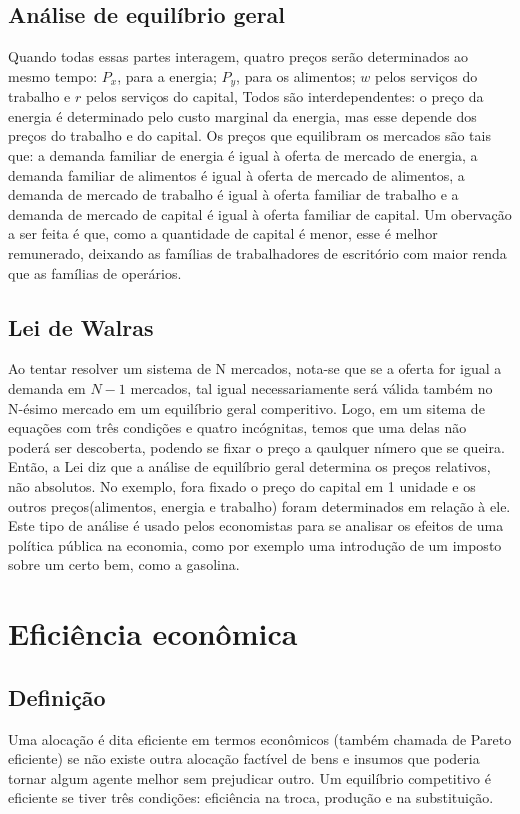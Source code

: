 \documentclass[oneside,12pt, letterpaper]{book}
\begin{document}
{{{\section{An{\'a}lise de equil{\'i}brio geral}
Quando todas essas partes interagem, quatro pre{\c c}os ser{\~a}o determinados ao mesmo tempo: $P_x$, para a energia; $P_y$, para os alimentos; $w$ pelos servi{\c c}os do 
trabalho e $r$ pelos servi{\c c}os do capital, Todos s{\~a}o interdependentes: o pre{\c c}o da energia {\'e} determinado pelo custo marginal da energia, mas esse depende dos 
pre{\c c}os do trabalho e do capital. Os pre{\c c}os que equilibram os mercados s{\~a}o tais que: a demanda familiar de energia {\'e} igual {\`a} oferta de mercado de energia, 
a demanda familiar de alimentos {\'e} igual {\`a} oferta de mercado de alimentos, a demanda de mercado de trabalho {\'e} igual {\`a} oferta familiar de trabalho e a demanda de mercado
de capital {\'e} igual {\`a} oferta familiar de capital. Um oberva{\c c}{\~a}o a ser feita {\'e} que, como a quantidade de capital {\'e} menor, esse {\'e} melhor remunerado, deixando as 
fam{\'i}lias de trabalhadores de escrit{\'o}rio com maior renda que as fam{\'i}lias de oper{\'a}rios. 
\section{Lei de Walras}
Ao tentar resolver um sistema de N mercados, nota-se que se a oferta for igual a demanda em $N-1$ mercados, tal igual necessariamente ser{\'a} v{\'a}lida tamb{\'e}m 
no N-{\'e}simo mercado em um equil{\'i}brio geral comperitivo. Logo, em um sitema de equa{\c c}{\~o}es com tr{\^e}s condi{\c c}{\~o}es e quatro inc{\'o}gnitas, temos que uma delas n{\~a}o poder{\'a} ser 
descoberta, podendo se fixar o pre{\c c}o a qaulquer n{\'i}mero que se queira. Ent{\~a}o, a Lei diz que a an{\'a}lise de equil{\'i}brio geral determina os pre{\c c}os relativos, n{\~a}o
absolutos. No exemplo, fora fixado o pre{\c c}o do capital em 1 unidade e os outros pre{\c c}os(alimentos, energia e trabalho) foram determinados em rela{\c c}{\~a}o {\`a} ele. 
Este tipo de an{\'a}lise {\'e} usado pelos economistas para se analisar os efeitos de uma pol{\'i}tica p{\'u}blica na economia, como por exemplo uma introdu{\c c}{\~a}o de um imposto sobre
um certo bem, como a gasolina.

\chapter{Eficiência econômica}
\section{Definição}
Uma alocação é dita eficiente em termos econômicos (também chamada de Pareto eficiente) se não existe outra alocação factível de bens e insumos que poderia tornar
algum agente melhor sem prejudicar outro. Um equilíbrio competitivo é eficiente se tiver três condições: eficiência na troca, produção e na substituição.
}}}
\end{document}
